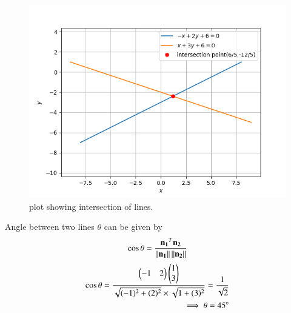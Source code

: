 \documentclass[journal,12pt,twocolumn]{IEEEtran}
\begin{document}
\begin{figure}[!ht]
\centering
\includegraphics[width=\columnwidth]{Figure_1.png}
\caption{plot showing intersection of lines.}
\label{Fig_1}
\end{figure}
Angle between two lines $\theta$ can be given by
\begin{align}
\cos \theta = \frac{\mathbf{n_1}^T\mathbf{n_2}}{\left\lVert\mathbf{n_1}\right\rVert\left\lVert\mathbf{n_2}\right\rVert}
\end{align}
\begin{align}
\cos \theta=\frac{\begin{pmatrix}-1&2\end{pmatrix}\begin{pmatrix}1\\3\end{pmatrix}}{\sqrt{(-1)^2 +(2)^2} \times \sqrt{1 +(3)^2}}=\frac{1}{\sqrt{2}}\\
\implies \theta = 45\degree
\end{align}
\end{document}

